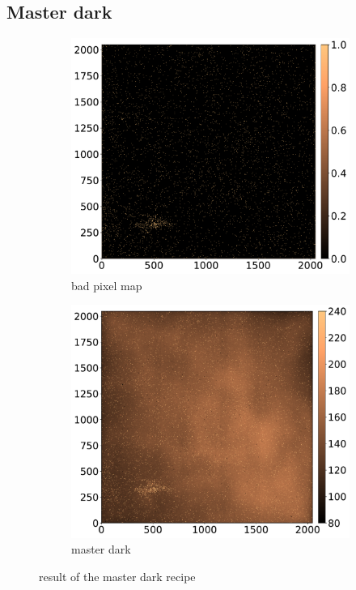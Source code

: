 \documentclass[twoside,single]{lion-msc}
\begin{document}
\subsection{Master dark}
\begin{figure}[!b]
\centering
\begin{subfigure}{.48\textwidth}
  \centering
  \includegraphics[width=1\linewidth]{badpixelmap}
  \caption{bad pixel map}
\end{subfigure}\hfill
\begin{subfigure}{.48\textwidth}
  \centering
  \includegraphics[width=1\linewidth]{dark}
  \caption{master dark}
\end{subfigure}
\caption{result of the master dark recipe}
\label{fig:masterdark}
\end{figure}
\end{document}
